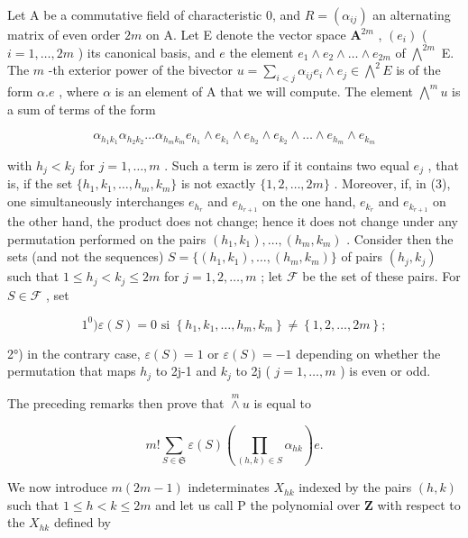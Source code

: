 Let A be a commutative field of characteristic 0, and \(R = (\alpha_{ij})\) an alternating matrix of even order \(2m\) on A. Let E denote the vector space \(\mathbf{A}^{2m}\) , \((e_i)\) ( \(i = 1, \ldots, 2m\) ) its canonical basis, and \(e\) the element \(e_1 \wedge e_2 \wedge \ldots \wedge e_{2m}\) of \(\bigwedge^{2m}\) E. The \(m\) -th exterior power of the bivector \(u = \sum_{i < j} \alpha_{ij} e_i \wedge e_j \in \bigwedge^2 E\) is of the form \(\alpha.e\) , where \(\alpha\) is an element of A that we will compute. The element \(\bigwedge^m u\) is a sum of terms of the form

\[
\alpha_ {h _ {1} k _ {1}} \alpha_ {h _ {2} k _ {2}} \dots \alpha_ {h _ {m} k _ {m}} e _ {h _ {1}} \wedge e _ {k _ {1}} \wedge e _ {h _ {2}} \wedge e _ {k _ {2}} \wedge \dots \wedge e _ {h _ {m}} \wedge e _ {k _ {m}}\tag{3}
\]

with \(h_j < k_j\) for \(j = 1, \ldots, m\) . Such a term is zero if it contains two equal \(e_j\) , that is, if the set \(\{h_1, k_1, \ldots, h_m, k_m\}\) is not exactly \(\{1, 2, \ldots, 2m\}\) . Moreover, if, in (3), one simultaneously interchanges \(e_{h_r}\) and \(e_{h_{r+1}}\) on the one hand, \(e_{k_r}\) and \(e_{k_{r+1}}\) on the other hand, the product does not change; hence it does not change under any permutation performed on the pairs \((h_1, k_1), \ldots, (h_m, k_m)\) . Consider then the sets (and not the sequences) \(S = \{(h_1, k_1), \ldots, (h_m, k_m)\}\) of pairs \((h_j, k_j)\) such that \(1 \leqslant h_j < k_j \leqslant 2m\) for \(j = 1, 2, \ldots, m\) ; let \(\mathscr{F}\) be the set of these pairs. For \(S \in \mathscr{F}\) , set

\[
1 ^ {0}) \varepsilon (S) = 0 \text {   si   } \left\{h _ {1}, k _ {1}, \dots , h _ {m}, k _ {m} \right\} \neq \left\{1, 2, \dots , 2 m \right\};
\]

2°) in the contrary case, \(\varepsilon(S)=1\) or \(\varepsilon(S)=-1\) depending on whether the permutation that maps \(h_{j}\) to 2j-1 and \(k_{j}\) to 2j ( \(j=1,\ldots,m\) ) is even or odd.

The preceding remarks then prove that \(\overset{m}{\wedge} u\) is equal to

\[
m! \sum_ {S \in \mathfrak {S}} \varepsilon (S) (\prod_ {(h, k) \in S} \alpha_ {h k}) e.\tag{4}
\]

We now introduce \(m(2m-1)\) indeterminates \(X_{hk}\) indexed by the pairs \((h,k)\) such that \(1\leqslant h<k\leqslant2m\) and let us call P the polynomial over \(\mathbf{Z}\) with respect to the \(X_{hk}\) defined by

